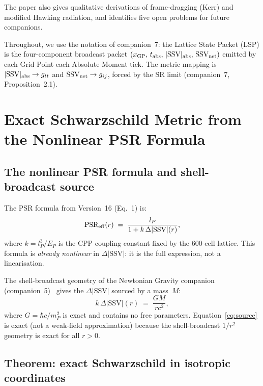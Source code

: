 \documentclass[12pt]{article}
\newcommand{\lP}{l_P}
\newcommand{\EP}{E_P}
\newcommand{\mP}{m_P}
\newcommand{\SSV}{\text{SSV}}
\newcommand{\PSR}{\text{PSR}}
\begin{document}
The paper also gives qualitative derivations of frame-dragging (Kerr)
and modified Hawking radiation, and identifies five open problems for
future companions.

Throughout, we use the notation of companion~7: the Lattice State
Packet (LSP) is the four-component broadcast packet
$(x_{\rm GP},\, t_{\rm abs},\, |\SSV|_{\rm abs},\, \SSV_{\rm net})$
emitted by each Grid Point each Absolute Moment tick.  The metric
mapping is $|\SSV|_{\rm abs} \to g_{tt}$ and
$\SSV_{\rm net} \to g_{ij}$, forced by the SR limit (companion~7,
Proposition~2.1).

\section{Exact Schwarzschild Metric from the Nonlinear PSR Formula}
\label{sec:schwarzschild}

\subsection{The nonlinear PSR formula and shell-broadcast source}
\label{subsec:psr}

The PSR formula from Version~16 (Eq.~1) is:
\begin{equation}
  \PSR_{\rm eff}(r) \;=\; \frac{\lP}{1 + k\,\Delta|\SSV|(r)},
  \label{eq:psr}
\end{equation}
where $k = \lP^3/\EP$ is the CPP coupling constant fixed by the
600-cell lattice.  This formula is \emph{already nonlinear} in
$\Delta|\SSV|$: it is the full expression, not a linearisation.

The shell-broadcast geometry of the Newtonian Gravity companion
(companion~5)~\cite{c5} gives the $\Delta|\SSV|$ sourced by a mass~$M$:
\begin{equation}
  k\,\Delta|\SSV|(r) \;=\; \frac{GM}{rc^2},
  \label{eq:source}
\end{equation}
where $G = \hbar c/\mP^2$ is exact and contains no free parameters.
Equation~\eqref{eq:source} is exact (not a weak-field approximation)
because the shell-broadcast $1/r^2$ geometry is exact for all $r > 0$.

\subsection{Theorem: exact Schwarzschild in isotropic coordinates}
\label{subsec:thm_schw}
\end{document}
